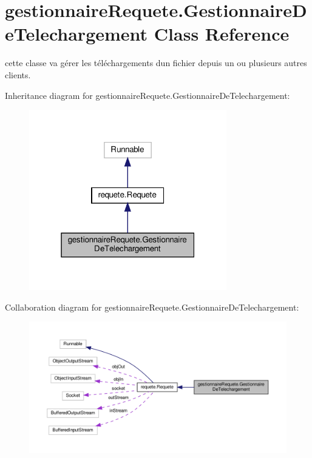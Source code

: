 \hypertarget{classgestionnaireRequete_1_1GestionnaireDeTelechargement}{}\section{gestionnaire\+Requete.\+Gestionnaire\+De\+Telechargement Class Reference}
\label{classgestionnaireRequete_1_1GestionnaireDeTelechargement}


cette classe va gérer les téléchargements d\textquotesingle{}un fichier depuis un ou plusieurs autres clients.  




Inheritance diagram for gestionnaire\+Requete.\+Gestionnaire\+De\+Telechargement\+:\nopagebreak
\begin{figure}[H]
\begin{center}
\leavevmode
\includegraphics[width=244pt]{classgestionnaireRequete_1_1GestionnaireDeTelechargement__inherit__graph}
\end{center}
\end{figure}


Collaboration diagram for gestionnaire\+Requete.\+Gestionnaire\+De\+Telechargement\+:\nopagebreak
\begin{figure}[H]
\begin{center}
\leavevmode
\includegraphics[width=350pt]{classgestionnaireRequete_1_1GestionnaireDeTelechargement__coll__graph}
\end{center}
\end{figure}
